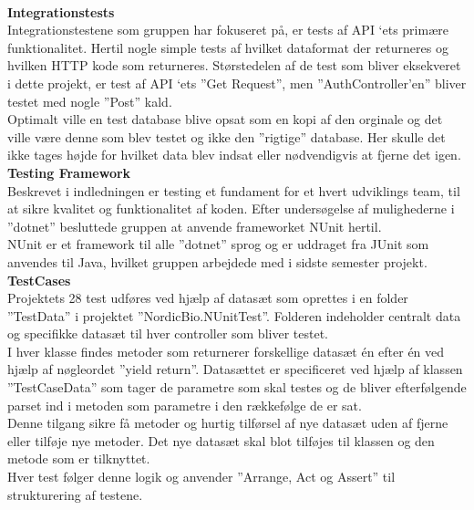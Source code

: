 \\
\textbf{Integrationstests}\\
Integrationstestene som gruppen har fokuseret på, er tests af API ‘ets primære funktionalitet. 
Hertil nogle simple tests af hvilket dataformat der returneres og hvilken HTTP kode som returneres. 
Størstedelen af de test som bliver eksekveret i dette projekt, er test af API ‘ets ”Get Request”, men 
”AuthController’en” bliver testet med nogle ”Post” kald. \\

Optimalt ville en test database blive opsat som en kopi af den orginale og det ville være denne som 
blev testet og ikke den ”rigtige” database. Her skulle det ikke tages højde for hvilket data blev indsat 
eller nødvendigvis at fjerne det igen.\\ 

\textbf{Testing Framework}\\
Beskrevet i indledningen er testing et fundament for et hvert udviklings team, til at sikre 
kvalitet og funktionalitet af koden. Efter undersøgelse af mulighederne i ”dotnet” besluttede 
gruppen at anvende frameworket NUnit hertil. \\

NUnit er et framework til alle ”dotnet” sprog og er uddraget fra JUnit som anvendes til Java, 
hvilket gruppen arbejdede med i sidste semester projekt.\\

\textbf{TestCases}\\
Projektets 28 test udføres ved hjælp af datasæt som oprettes i en folder ”TestData” i projektet 
”NordicBio.NUnitTest”. Folderen indeholder centralt data og specifikke datasæt til hver controller 
som bliver testet. \\

I hver klasse findes metoder som returnerer forskellige datasæt én efter én ved hjælp af nøgleordet 
”yield return”. Datasættet er specificeret ved hjælp af klassen ”TestCaseData” som tager de parametre 
som skal testes og de bliver efterfølgende parset ind i metoden som parametre i den rækkefølge de er sat.\\

Denne tilgang sikre få metoder og hurtig tilførsel af nye datasæt uden af fjerne eller tilføje nye metoder. 
Det nye datasæt skal blot tilføjes til klassen og den metode som er tilknyttet.\\

Hver test følger denne logik og anvender ”Arrange, Act og Assert” til strukturering af testene. 
